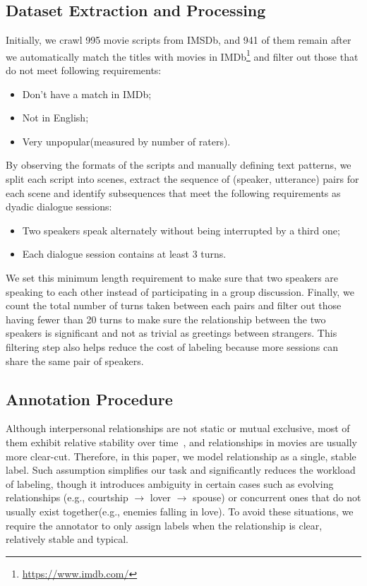 \documentclass[letterpaper]{article} \usepackage{aaai21}  \usepackage{times}  \usepackage{helvet} \usepackage{courier}  \usepackage[hyphens]{url}  \usepackage{graphicx} \usepackage{xcolor}
\begin{document}
\subsection{Dataset Extraction and Processing}
Initially, we crawl 995 movie scripts from IMSDb, and 941 of them remain after we automatically match the titles with movies in IMDb\footnote{\url{https://www.imdb.com/}} and filter out those that do not meet following requirements:
\begin{itemize}
	\item Don't have a match in IMDb; 
	\item Not in English; 
	\item Very unpopular(measured by number of raters). 
\end{itemize}

By observing the formats of the scripts and manually defining text patterns, 
we split each script into scenes, extract the sequence of (speaker, utterance) 
pairs for each scene and identify subsequences that meet the following requirements  
as dyadic dialogue sessions: 
\begin{itemize}
	\item Two speakers speak alternately without being interrupted by a third one; 
	\item Each dialogue session contains at least 3 turns. 
\end{itemize}

We set this minimum length requirement to make sure that two speakers are speaking to each other instead of participating in a group discussion. Finally, we count the total number of turns taken between each pairs and filter out those having fewer than 20 turns to make sure the relationship between the two speakers is significant and not as trivial as greetings between strangers. This filtering step also helps reduce the cost of labeling because more sessions can share the same pair of speakers.

\subsection{Annotation Procedure}
Although interpersonal relationships are not static or mutual exclusive, most of them exhibit relative stability over time~\cite{gadde1987stability}, and relationships in movies are usually more clear-cut. Therefore, in this paper, we model relationship as a single, stable label. Such assumption simplifies our task and significantly reduces the workload of labeling, though it introduces 
ambiguity in certain cases such as evolving relationships (e.g., courtship $\rightarrow$ lover $\rightarrow$ spouse) or concurrent ones that do not usually exist together(e.g., enemies falling in love). To avoid these situations, we require the annotator to only assign labels when the relationship is clear, relatively stable and typical.
\end{document}
